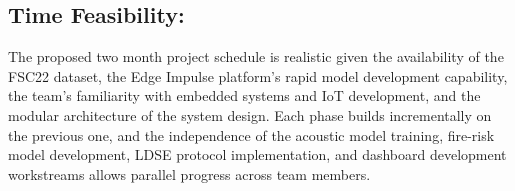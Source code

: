 \subsection{Time Feasibility:} The proposed two month project schedule is realistic
given the availability of the FSC22 dataset, the Edge Impulse platform's rapid
model development capability, the team's familiarity with embedded systems and IoT
development, and the modular architecture of the system design. Each phase builds
incrementally on the previous one, and the independence of the acoustic model
training, fire-risk model development, LDSE protocol implementation, and dashboard
development workstreams allows parallel progress across team members.

\clearpage
